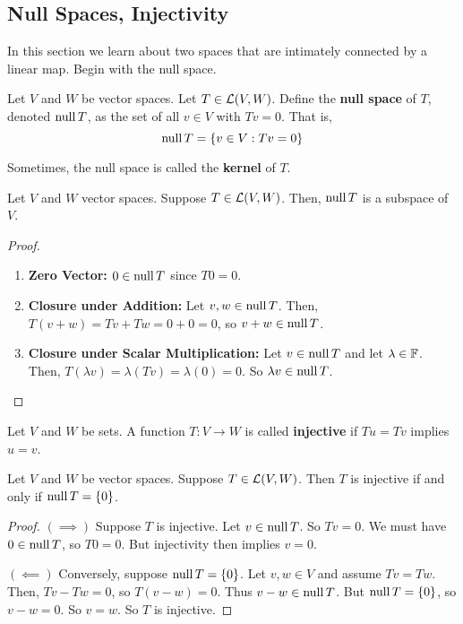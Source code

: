 \subsection*{Null Spaces, Injectivity}
In this section we learn about two spaces that are intimately connected by a linear map. Begin with the null space.
\begin{definition}
    Let $V$ and $W$ be vector spaces. Let $T\in\mathcal{L}(V,W)$. Define the \textbf{null space} of $T$, denoted $\operatorname{null} T$, as the set of all $v\in V$ with $Tv = 0$. That is,
    \[ \operatorname{null} T = \{v\in V : Tv = 0\} \]
\end{definition}
Sometimes, the null space is called the \textbf{kernel} of $T$.
\begin{theorem}
    Let $V$ and $W$ vector spaces. Suppose $T\in\mathcal{L}(V,W)$. Then, $\operatorname{null} T$ is a subspace of $V$.
\end{theorem}
\begin{proof}
    \begin{enumerate}
        \item \textbf{Zero Vector:} $0\in \operatorname{null} T$ since $T0 = 0$.
        \item \textbf{Closure under Addition:} Let $v,w\in \operatorname{null} T$. Then, $T(v+w) = Tv+Tw = 0+0 = 0$, so $v+w\in \operatorname{null} T$.
        \item \textbf{Closure under Scalar Multiplication:} Let $v\in \operatorname{null} T$ and let $\lambda\in\mathbb F$. Then, $T(\lambda v) = \lambda(Tv) = \lambda(0) = 0$. So $\lambda v \in \operatorname{null} T$.
    \end{enumerate} 
\end{proof}
\begin{definition}[Injective]
    Let $V$ and $W$ be sets. A function $T: V\to W$ is called \textbf{injective} if $Tu=Tv$ implies $u=v$.
\end{definition}
\begin{theorem}
    Let $V$ and $W$ be vector spaces. Suppose $T\in\mathcal{L}(V,W)$. Then $T$ is injective if and only if $\operatorname{null} T = \{0\}$.
\end{theorem}
\begin{proof}
    $(\implies)$ Suppose $T$ is injective. Let $v\in \operatorname{null} T$. So $Tv = 0$. We must have $0\in \operatorname{null} T$, so $T0=0$. But injectivity then implies $v=0$. 

    $(\impliedby)$ Conversely, suppose $\operatorname{null} T = \{0\}$. Let $v,w\in V$ and assume $Tv=Tw$. Then, $Tv - Tw = 0$, so $T(v-w) = 0$. Thus $v-w\in \operatorname{null} T$. But $\operatorname{null} T = \{0\}$, so $v-w = 0$. So $v=w$. So $T$ is injective.
\end{proof}
